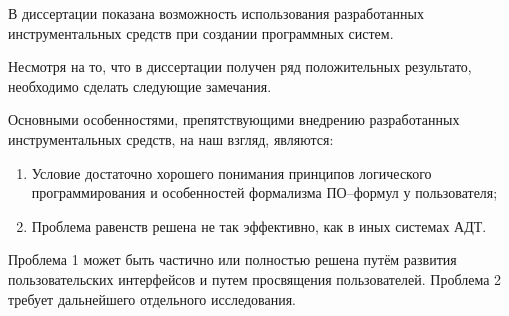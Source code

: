 
В диссертации показана возможность использования разработанных инструментальных средств при создании программных систем.

Несмотря на то, что в диссертации получен ряд положительных результато, необходимо сделать следующие замечания.

Основными особенностями, препятствующими внедрению разработанных инструментальных средств, на наш взгляд, являются:

\begin{enumerate}
\item Условие достаточно хорошего понимания принципов логического программирования и особенностей формализма ПО--формул у пользователя;
\item Проблема равенств решена не так эффективно, как в иных системах АДТ. %
\end{enumerate}

Проблема 1 может быть частично или полностью решена путём развития пользовательских интерфейсов и путем просвящения пользователей. Проблема 2 требует дальнейшего отдельного исследования.

